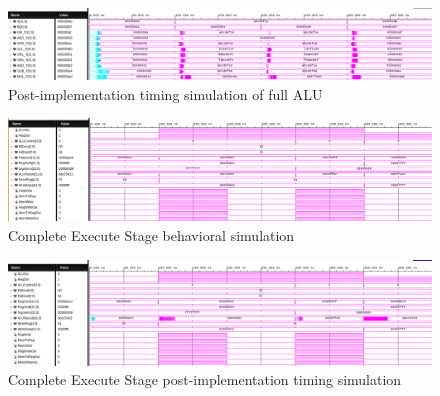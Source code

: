 \documentclass[CMPE]{../KGCOEReport}
\begin{document}
	\begin{figure}[h!]
        \centering
        \includegraphics[width=\textwidth]{img/alu_full_impl}
        \caption{Post-implementation timing simulation of full ALU}
        \label{fig:demo1}
	\end{figure}
	\begin{figure}[h!]
        \centering
        \includegraphics[width=\textwidth]{img/exec_2_behav}
        \caption{Complete Execute Stage behavioral simulation}
        \label{fig:demo1}
	\end{figure}
	\begin{figure}[h!]
        \centering
        \includegraphics[width=\textwidth]{img/exec_2_impl}
        \caption{Complete Execute Stage post-implementation timing simulation}
        \label{fig:demo1}
	\end{figure}
\end{document}

